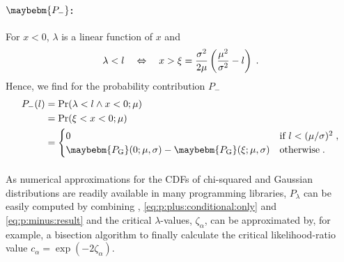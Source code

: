 \documentclass[a4paper]{article}
\newcommand*\PG{\maybebm{P_\mathrm{G}}\xspace}
\begin{document}
\paragraph{$\maybebm{P_-}$:}
For $x<0$, $\lambda$ is a linear function of $x$ and
%
\begin{equation*}
  \lambda < l
  \quad \Leftrightarrow \quad
  x > \xi = \frac{\sigma^2}{2\mu} \left( \frac{\mu^2}{\sigma^2} - l \right)
  \;.
\end{equation*}
%
Hence, we find for the probability contribution $P_-$
%
\begin{align}
  P_-(l)
  & =
  \Pr(\lambda < l \wedge x < 0; \mu)
  \nonumber
  \\
  & =
  \Pr(\xi < x < 0; \mu)
  \nonumber
  \\
  & =
  \begin{cases}
    \displaystyle
    0 & \text{if } l < (\mu/\sigma)^2 \fcomma \\
    \displaystyle
    \PG(0; \mu, \sigma) - \PG(\xi; \mu, \sigma) & \text{otherwise} \fstop
  \end{cases}
  \label{eq:p:minus:result}
\end{align}
%

\paragraph{}
As numerical approximations for the CDFs of chi-squared and Gaussian
distributions are readily available in many programming libraries,
$P_\lambda$ can be easily computed by combining ,
\eqref{eq:p:plus:conditional:only} and \eqref{eq:p:minus:result} and the
critical $\lambda$-values, $\zeta_\alpha$, can be approximated by, for
example, a bisection algorithm to finally calculate the critical
likelihood-ratio value $c_\alpha = \exp(-2\zeta_\alpha)$.

\printbibliography[heading=bibintoc]
\end{document}
